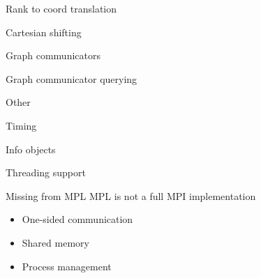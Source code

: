 \documentclass[10pt]{beamer}
\begin{document}
\begin{numberedframe}{Rank to coord translation}
  
\end{numberedframe}

\begin{numberedframe}{Cartesian shifting}
    
\end{numberedframe}

\begin{numberedframe}{Graph communicators}
  
\end{numberedframe}
\begin{numberedframe}{Graph communicator querying}
  
\end{numberedframe}

 {Other}

\begin{numberedframe}{Timing}
  
\end{numberedframe}

\begin{numberedframe}{Info objects}
  
\end{numberedframe}

\begin{numberedframe}{Threading support}
  
\end{numberedframe}

\begin{frame}{Missing from MPL}
  MPL is not a full MPI implementation
  \begin{itemize}
  \item One-sided communication
  \item Shared memory
  \item Process management
  \end{itemize}
\end{frame}
\end{document}
